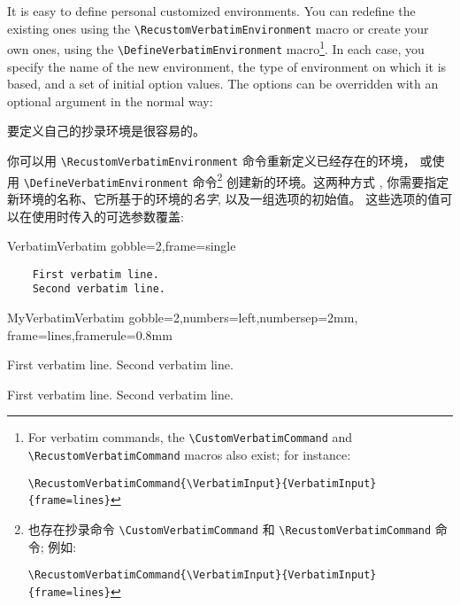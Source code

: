 \documentclass[twoside]{article}
\newif\ifChangeBar \ChangeBarfalse
\newcommand\cs[1]{\texttt{\textbackslash#1}}
\newcommand\verbatimTxt{抄录}
\begin{document}
\ifChangeBar\begin{changebar}\fi
\VerbatimFootnotes
  It is easy to define personal customized environments. You can redefine
the existing ones using the \cs{RecustomVerbatimEnvironment} macro or create
your own ones, using the \cs{DefineVerbatimEnvironment} macro\footnote{%
\ifChangeBar\begin{changebar}\fi
For verbatim commands, the \cs{CustomVerbatimCommand} and
\cs{RecustomVerbatimCommand} macros also exist; for instance:

\noindent
\verb+\RecustomVerbatimCommand{\VerbatimInput}{VerbatimInput}{frame=lines}+
\ifChangeBar\end{changebar}\fi}.
In each case, you specify the name of the new environment, the type of
environment on which it is based, and a set of initial option values. The
options can be overridden with an optional argument in the normal way:

要定义自己的{\verbatimTxt}环境是很容易的。 
  
你可以用 \cs{RecustomVerbatimEnvironment} 命令重新定义已经存在的环境，
或使用 \cs{DefineVerbatimEnvironment} 命令\footnote{%
  \ifChangeBar\begin{changebar}\fi
    也存在{\verbatimTxt}命令 \cs{CustomVerbatimCommand} 和
  \cs{RecustomVerbatimCommand} 命令; 例如:
  
  \noindent
  \verb+\RecustomVerbatimCommand{\VerbatimInput}{VerbatimInput}{frame=lines}+
  \ifChangeBar\end{changebar}\fi} 创建新的环境。这两种方式
, 你需要指定新环境的名称、它所基于的环境的{\em 名字},  
以及一组选项的初始值。 
这些选项的值可以在使用时传入的可选参数覆盖:



\begin{SideBySideExample}
  \RecustomVerbatimEnvironment
    {Verbatim}{Verbatim}
    {gobble=2,frame=single}
  \begin{Verbatim}
    First verbatim line.
    Second verbatim line.
  \end{Verbatim}
\end{SideBySideExample}
\ifChangeBar\end{changebar}\fi

\begin{SideBySideExample}
  \DefineVerbatimEnvironment%
    {MyVerbatim}{Verbatim}
    {gobble=2,numbers=left,numbersep=2mm,
     frame=lines,framerule=0.8mm}
  \begin{MyVerbatim}
    First verbatim line.
    Second verbatim line.
  \end{MyVerbatim}

  \begin{MyVerbatim}[numbers=none,
                     framerule=1pt]
    First verbatim line.
    Second verbatim line.
  \end{MyVerbatim}
\end{SideBySideExample}
\end{document}

